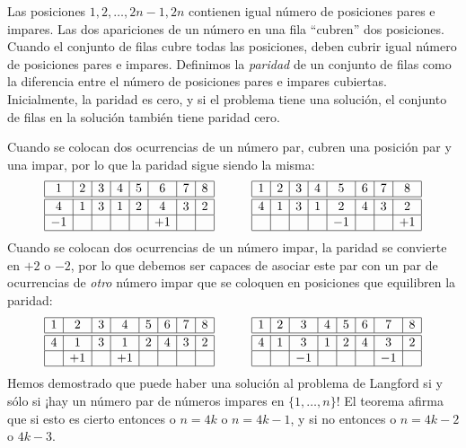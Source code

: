 Las posiciones $1,2,\ldots,2n-1,2n$ contienen igual número de posiciones pares e impares. Las dos apariciones de un número en una fila ``cubren'' dos posiciones. Cuando el conjunto de filas cubre todas las posiciones, deben cubrir igual número de posiciones pares e impares. Definimos la \emph{paridad} de un conjunto de filas como la diferencia entre el número de posiciones pares e impares cubiertas. Inicialmente, la paridad es cero, y si el problema tiene una solución, el conjunto de filas en la solución también tiene paridad cero.

Cuando se colocan dos ocurrencias de un número par, cubren una posición par y una impar, por lo que la paridad sigue siendo la misma:
\[
\begin{array}{|c|c|c|c|c|c|c|c|}
\hline
1&2&3&4&5&6&7&8\\
\hline\hline
4&1&3&1&2&4&3&2\\\hline
-1&&&&&+1&&\\\hline
\end{array}
\hspace{3em}
\begin{array}{|c|c|c|c|c|c|c|c|}
\hline
1&2&3&4&5&6&7&8\\
\hline\hline
4&1&3&1&2&4&3&2\\\hline
&&&&-1&&&+1\\\hline
\end{array}
\]
Cuando se colocan dos ocurrencias de un número impar, la paridad se convierte en $+2$ o $-2$, por lo que debemos ser capaces de asociar este par con un par de ocurrencias de \emph{otro} número impar que se coloquen en posiciones que equilibren la paridad:
\[
\begin{array}{|c|c|c|c|c|c|c|c|}
\hline
1&2&3&4&5&6&7&8\\
\hline\hline
4&1&3&1&2&4&3&2\\\hline
&+1&&+1&&&&\\\hline
\end{array}
\hspace{3em}
\begin{array}{|c|c|c|c|c|c|c|c|}
\hline
1&2&3&4&5&6&7&8\\
\hline\hline
4&1&3&1&2&4&3&2\\\hline
&&-1&&&&-1&\\\hline
\end{array}
\]
Hemos demostrado que puede haber una solución al problema de Langford si y sólo si ¡hay un número par de números impares en $\{1,\ldots,n\}$!
El teorema afirma que si esto es cierto entonces o $n=4k$ o $n=4k-1$, y si no entonces o $n=4k-2$ o $4k-3$.

